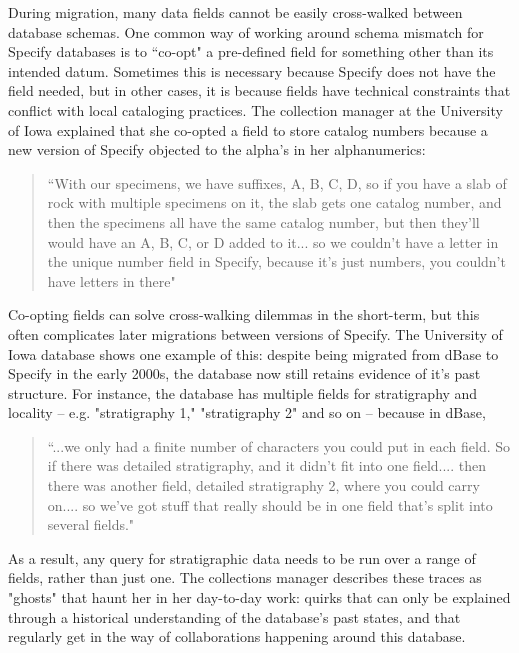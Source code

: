 During migration, many data fields cannot be easily cross-walked between database schemas. One common way of working around schema mismatch for Specify databases is to “co-opt" a pre-defined field for something other than its intended datum. Sometimes this is necessary because Specify does not have the field needed, but in other cases, it is because fields have technical constraints that conflict with local cataloging practices. The collection manager at the University of Iowa explained that she co-opted a field to store catalog numbers because a new version of Specify objected to the alpha’s in her alphanumerics:
\begin{quote}
“With our specimens, we have suffixes, A, B, C, D, so if you have a slab of rock with multiple specimens on it, the slab gets one catalog number, and then the specimens all have the same catalog number, but then they'll would have an A, B, C, or D added to it... so we couldn't have a letter in the unique number field in Specify, because it's just numbers, you couldn't have letters in there"
\end{quote}

Co-opting fields can solve cross-walking dilemmas in the short-term, but this often complicates later migrations between versions of Specify. The University of Iowa database shows one example of this: despite being migrated from dBase to Specify in the early 2000s, the database now still retains evidence of it's past structure. For instance, the database has multiple fields for stratigraphy and locality -- e.g. "stratigraphy 1," "stratigraphy 2" and so on -- because in dBase,\begin{quote} “...we only had a finite number of characters you could put in each field. So if there was detailed stratigraphy, and it didn't fit into one field.... then there was another field, detailed stratigraphy 2, where you could carry on.... so we've got stuff that really should be in one field that's split into several fields."\end{quote}
As a result, any query for stratigraphic data needs to be run over a range of fields, rather than just one. The collections manager describes these traces as "ghosts" that haunt her in her day-to-day work: quirks that can only be explained through a historical understanding of the database's past states, and that regularly get in the way of collaborations happening around this database.

